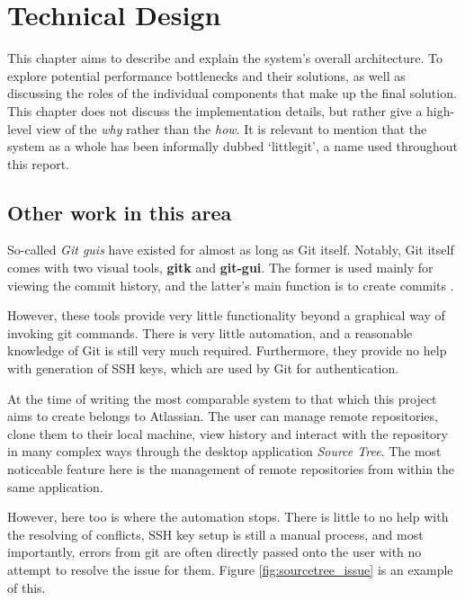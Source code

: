\chapter{Technical Design}

This chapter aims to describe and explain the system's overall architecture. To explore potential performance bottlenecks and their solutions, as well as discussing the roles of the individual components that make up the final solution. This chapter does not discuss the implementation details, but rather give a high-level view of the \emph{why} rather than the \emph{how}. It is relevant to mention that the system as a whole has been informally dubbed `littlegit', a name used throughout this report.

\section{Other work in this area}

So-called \emph{Git guis} have existed for almost as long as Git itself. Notably, Git itself comes with two visual tools, \textbf{gitk} and \textbf{git-gui}. The former is used mainly for viewing the commit history, and the latter's main function is to create commits \cite{gitguis}.

However, these tools provide very little functionality beyond a graphical way of invoking git commands. There is very little automation, and a reasonable knowledge of Git is still very much required. Furthermore, they provide no help with generation of SSH keys, which are used by Git for authentication.

At the time of writing the most comparable system to that which this project aims to create belongs to Atlassian. The user can manage remote repositories, clone them to their local machine, view history and interact with the repository in many complex ways through the desktop application \emph{Source Tree}. The most noticeable feature here is the management of remote repositories from within the same application. 

However, here too is where the automation stops. There is little to no help with the resolving of conflicts, SSH key setup is still a manual process, and most importantly, errors from git are often directly passed onto the user with no attempt to resolve the issue for them. Figure \ref{fig:sourcetree_issue} is an example of this.


